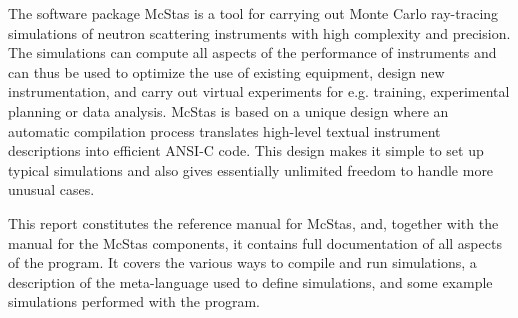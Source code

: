 The software package McStas is a tool for carrying out Monte Carlo
ray-tracing simulations of neutron scattering instruments with high
complexity and precision. The simulations can compute all aspects of the
performance of instruments and can thus be used to optimize the use of
existing equipment, design new instrumentation, and carry out virtual
experiments for e.g. training, experimental planning or data analysis. McStas
is based on a unique design where an automatic compilation process
translates high-level textual instrument descriptions into efficient
ANSI-C code. This design makes it simple to set up typical simulations
and also gives essentially unlimited freedom to handle more unusual
cases.

This report constitutes the reference manual for McStas, and,
together with the manual for the McStas components, it
contains full documentation of all aspects of the program. It covers
the various ways to compile and run simulations, a description of the
meta-language used to define simulations, 
and some example simulations performed with
the program.
